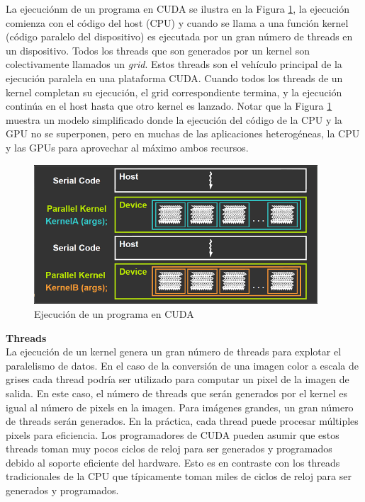 La ejecuciónm de un programa en CUDA se ilustra en la Figura \ref{fig:execution_cuda}, la ejecución comienza con el
código del host (CPU) y cuando se llama a una función kernel (código paralelo del dispositivo) es ejecutada por un gran
número de threads en un dispositivo. Todos los threads que son generados por un kernel son colectivamente llamados un
\textit{grid}. Estos threads son el vehículo principal de la ejecución paralela en una plataforma CUDA. Cuando todos los
threads de un kernel completan su ejecución, el grid correspondiente termina, y la ejecución continúa en el host hasta
que otro kernel es lanzado. Notar que la Figura \ref{fig:execution_cuda} muestra un modelo simplificado donde la
ejecución del código de la CPU y la GPU no se superponen, pero en muchas de las aplicaciones heterogéneas, la CPU y las
GPUs para aprovechar al máximo ambos recursos.

\begin{figure}[H]
  \centering
  \includegraphics[width=400px]{./images/execution_cuda.png}
  \caption{Ejecución de un programa en CUDA}
  \label{fig:execution_cuda}
\end{figure}

\begin{tcolorbox}[colback=yellow,colframe=yellow!75!black,arc=0pt,outer arc=0pt]
  \textbf{Threads} \\

  La ejecución de un kernel genera un gran número de threads para explotar el paralelismo de datos. En el caso de la
  conversión de una imagen color a escala de grises cada thread podría ser utilizado para computar un pixel de la imagen
  de salida. En este caso, el número de threads que serán generados por el kernel es igual al número de pixels en la
  imagen. Para imágenes grandes, un gran número de threads serán generados. En la práctica, cada thread puede procesar
  múltiples pixels para eficiencia. Los programadores de CUDA pueden asumir que estos threads toman muy pocos ciclos de
  reloj para ser generados y programados debido al soporte eficiente del hardware. Esto es en contraste con los threads
  tradicionales de la CPU que típicamente toman miles de ciclos de reloj para ser generados y programados.
\end{tcolorbox}

\subsection{}




